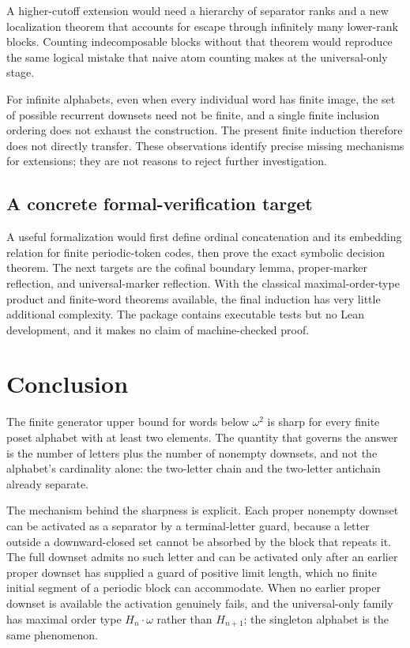 \documentclass[11pt,a4paper]{article}
\numberwithin{equation}{section}
\theoremstyle{definition}
\theoremstyle{remark}
\newcommand{\Hn}[1]{H_{#1}}
\begin{document}
A higher-cutoff extension would need a hierarchy of separator ranks and a
new localization theorem that accounts for escape through infinitely many
lower-rank blocks. Counting indecomposable blocks without that theorem
would reproduce the same logical mistake that naive atom counting makes
at the universal-only stage.

For infinite alphabets, even when every individual word has finite image,
the set of possible recurrent downsets need not be finite, and a single
finite inclusion ordering does not exhaust the construction. The present
finite induction therefore does not directly transfer. These observations
identify precise missing mechanisms for extensions; they are not reasons
to reject further investigation.

\subsection{A concrete formal-verification target}
A useful formalization would first define ordinal concatenation and its
embedding relation for finite periodic-token codes, then prove the exact
symbolic decision theorem. The next targets are the cofinal boundary lemma,
proper-marker reflection, and universal-marker reflection. With the
classical maximal-order-type product and finite-word theorems available,
the final induction has very little additional complexity. The package
contains executable tests but no Lean development, and it makes no claim
of machine-checked proof.

\section{Conclusion}
\label{sec:conclusion}

The finite generator upper bound for words below $\omega^2$ is sharp for every
finite poset alphabet with at least two elements. The quantity that governs the
answer is the number of letters plus the number of nonempty downsets, and not
the alphabet's cardinality alone: the two-letter chain and the two-letter
antichain already separate.

The mechanism behind the sharpness is explicit. Each proper nonempty downset
can be activated as a separator by a terminal-letter guard, because a letter
outside a downward-closed set cannot be absorbed by the block that repeats it.
The full downset admits no such letter and can be activated only after an
earlier proper downset has supplied a guard of positive limit length, which no
finite initial segment of a periodic block can accommodate. When no earlier
proper downset is available the activation genuinely fails, and the
universal-only family has maximal order type $\Hn n\cdot\omega$ rather than
$\Hn{n+1}$; the singleton alphabet is the same phenomenon.
\end{document}
